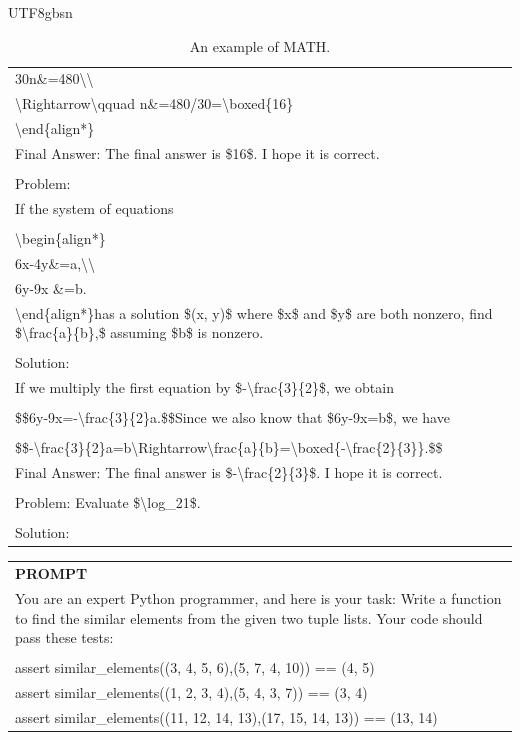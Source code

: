 \documentclass[11pt, a4paper, logo, copyright, nonumbering]{deepseek}
\begin{document}
\begin{CJK*}{UTF8}{gbsn}
\begin{table}[h]
\begin{tabular}{p{12cm}}
\\30n\&=480\textbackslash \textbackslash 
\\\textbackslash Rightarrow\textbackslash qquad n\&=480/30=\textbackslash boxed\{16\}
\\\textbackslash end\{align*\}
\\Final Answer: The final answer is \$16\$. I hope it is correct.
\\
\\Problem:
\\If the system of equations
\\
\\\textbackslash begin\{align*\}
\\6x-4y\&=a,\textbackslash \textbackslash 
\\6y-9x \&=b.
\\\textbackslash end\{align*\}has a solution \$(x, y)\$ where \$x\$ and \$y\$ are both nonzero, find \$\textbackslash frac\{a\}\{b\},\$ assuming \$b\$ is nonzero.
\\
\\Solution:
\\If we multiply the first equation by \$-\textbackslash frac\{3\}\{2\}\$, we obtain
\\
\\\$\$6y-9x=-\textbackslash frac\{3\}\{2\}a.\$\$Since we also know that \$6y-9x=b\$, we have
\\
\\\$\$-\textbackslash frac\{3\}\{2\}a=b\textbackslash Rightarrow\textbackslash frac\{a\}\{b\}=\textbackslash boxed\{-\textbackslash frac\{2\}\{3\}\}.\$\$
\\Final Answer: The final answer is \$-\textbackslash frac\{2\}\{3\}\$. I hope it is correct.\\
\\
Problem: Evaluate \$\textbackslash log\_21\$.\\
\\
Solution:\\
\bottomrule
\end{tabular}
    \caption{\centering An example of MATH.}
    \label{tab:math_eval_format_example}
\end{table}

\begin{table}[h]
    \centering \small
\begin{tabular}{p{12cm}}
\toprule
\textbf{PROMPT}\\
You are an expert Python programmer, and here is your task: Write a function to find the similar elements from the given two tuple lists. Your code should pass these tests:\\
\\
assert similar\_elements((3, 4, 5, 6),(5, 7, 4, 10)) == (4, 5)\\
assert similar\_elements((1, 2, 3, 4),(5, 4, 3, 7)) == (3, 4)\\
assert similar\_elements((11, 12, 14, 13),(17, 15, 14, 13)) == (13, 14)\\


\end{tabular}
\end{table}
\end{CJK*}
\end{document}
